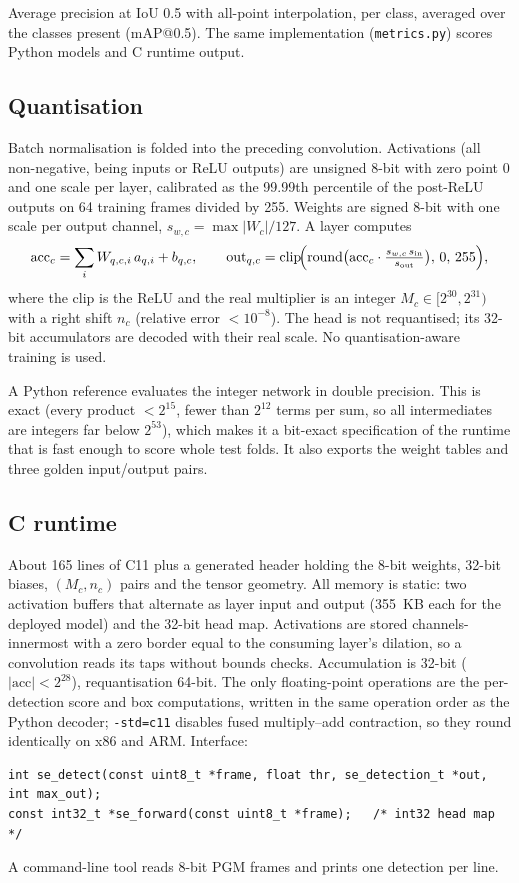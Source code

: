 \documentclass[11pt,a4paper]{article}
\begin{document}
Average precision at IoU 0.5 with all-point interpolation, per class,
averaged over the classes present (mAP@0.5). The same implementation
(\texttt{metrics.py}) scores Python models and C runtime output.

\subsection{Quantisation}
\label{sec:quant}

Batch normalisation is folded into the preceding convolution. Activations
(all non-negative, being inputs or ReLU outputs) are unsigned 8-bit with zero
point 0 and one scale per layer, calibrated as the 99.99th percentile of the
post-ReLU outputs on 64 training frames divided by 255. Weights are signed
8-bit with one scale per output channel, $s_{w,c} = \max|W_c|/127$. A layer
computes
\begin{equation}
  \mathrm{acc}_c = \sum_i W_{q,c,i}\, a_{q,i} + b_{q,c}, \qquad
  \mathrm{out}_{q,c} = \operatorname{clip}\!\Bigl(\operatorname{round}\bigl(\mathrm{acc}_c \cdot \tfrac{s_{w,c}\, s_\text{in}}{s_\text{out}}\bigr),\, 0,\, 255\Bigr),
\end{equation}
where the clip is the ReLU and the real multiplier is an integer
$M_c \in [2^{30}, 2^{31})$ with a right shift $n_c$ (relative error
$< 10^{-8}$). The head is not requantised; its 32-bit accumulators are
decoded with their real scale. No quantisation-aware training is used.

A Python reference evaluates the integer network in double precision. This
is exact (every product $< 2^{15}$, fewer than $2^{12}$ terms per sum, so
all intermediates are integers far below $2^{53}$), which makes it a
bit-exact specification of the runtime that is fast enough to score whole
test folds. It also exports the weight tables and three golden input/output
pairs.

\subsection{C runtime}
\label{sec:runtime}

About 165 lines of C11 plus a generated header holding the 8-bit weights,
32-bit biases, $(M_c, n_c)$ pairs and the tensor geometry. All memory is
static: two activation buffers that alternate as layer input and output
(355~KB each for the deployed model) and the 32-bit head map. Activations
are stored channels-innermost with a zero border equal to the consuming
layer's dilation, so a convolution reads its taps without bounds checks.
Accumulation is 32-bit ($|\mathrm{acc}| < 2^{28}$), requantisation 64-bit.
The only floating-point operations are the per-detection score and box
computations, written in the same operation order as the Python decoder;
\texttt{-std=c11} disables fused multiply--add contraction, so they round
identically on x86 and ARM. Interface:
{\small
\begin{verbatim}
int se_detect(const uint8_t *frame, float thr, se_detection_t *out, int max_out);
const int32_t *se_forward(const uint8_t *frame);   /* int32 head map */
\end{verbatim}
}
A command-line tool reads 8-bit PGM frames and prints one detection per line.
\end{document}
